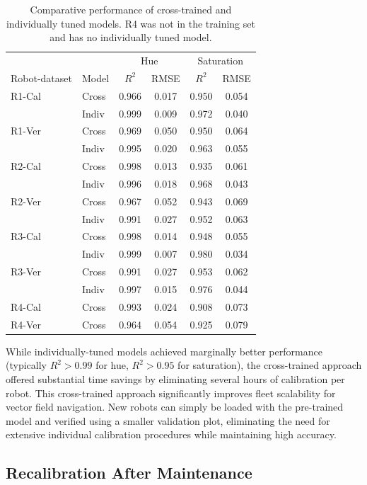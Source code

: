\begin{table}[htbp]
\centering
\caption{Comparative performance of cross-trained and individually tuned
models. R4 was not in the training set and has no individually tuned
model.}
\label{tab:ch2:calibration}
\begin{tabular}{llcccc}
\hline
 & & \multicolumn{2}{c}{Hue} & \multicolumn{2}{c}{Saturation} \\
Robot-dataset & Model & $R^2$ & RMSE & $R^2$ & RMSE \\
\hline
R1-Cal & Cross & 0.966 & 0.017 & 0.950 & 0.054 \\
       & Indiv & 0.999 & 0.009 & 0.972 & 0.040 \\
R1-Ver & Cross & 0.969 & 0.050 & 0.950 & 0.064 \\
       & Indiv & 0.995 & 0.020 & 0.963 & 0.055 \\
R2-Cal & Cross & 0.998 & 0.013 & 0.935 & 0.061 \\
       & Indiv & 0.996 & 0.018 & 0.968 & 0.043 \\
R2-Ver & Cross & 0.967 & 0.052 & 0.943 & 0.069 \\
       & Indiv & 0.991 & 0.027 & 0.952 & 0.063 \\
R3-Cal & Cross & 0.998 & 0.014 & 0.948 & 0.055 \\
       & Indiv & 0.999 & 0.007 & 0.980 & 0.034 \\
R3-Ver & Cross & 0.991 & 0.027 & 0.953 & 0.062 \\
       & Indiv & 0.997 & 0.015 & 0.976 & 0.044 \\
R4-Cal & Cross & 0.993 & 0.024 & 0.908 & 0.073 \\
R4-Ver & Cross & 0.964 & 0.054 & 0.925 & 0.079 \\
\hline
\end{tabular}
\end{table}

While individually-tuned models achieved marginally better performance
(typically $R^2 > 0.99$ for hue, $R^2 > 0.95$ for saturation), the
cross-trained approach offered substantial time savings by eliminating
several hours of calibration per robot. This cross-trained approach
significantly improves fleet scalability for vector field navigation. New
robots can simply be loaded with the pre-trained model and verified using
a smaller validation plot, eliminating the need for extensive individual
calibration procedures while maintaining high accuracy.

\subsection{Recalibration After Maintenance}

